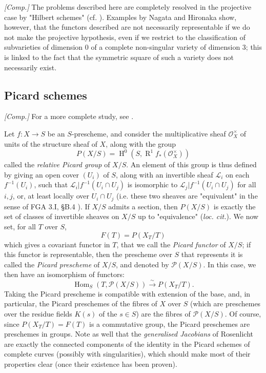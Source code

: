 \begin{remark}\label{fga3.ii-c.2-remark}
    \emph{[Comp.]}
    The problems described here are completely resolved in the projective case by "Hilbert schemes" (cf. ).
    Examples by Nagata and Hironaka show, however, that the functors described are not necessarily representable if we do not make the projective hypothesis, even if we restrict to the classification of subvarieties of dimension $0$ of a complete non-singular variety of dimension $3$;
    this is linked to the fact that the symmetric square of such a variety does not necessarily exist.
\end{remark}

\subsection{Picard schemes}\label{fga3.ii-c.3}

\emph{[Comp.]}
For a more complete study, see .

Let $f\colon X\to S$ be an $S$-prescheme, and consider the multiplicative sheaf $\mathcal{O}_X^\times$ of units of the structure sheaf of $X$, along with the group
\[
    P(X/S)
    = \operatorname{H}^0(S,\operatorname{R}^1f_*(\mathcal{O}_X^\times))
\]
called the \emph{relative Picard group} of $X/S$.
An element of this group is thus defined by giving an open cover $(U_i)$ of $S$, along with an invertible sheaf $\mathcal{L}_i$ on each $f^{-1}(U_i)$, such that $\mathcal{L}_i|f^{-1}(U_i\cap U_j)$ is isomorphic to $\mathcal{L}_j|f^{-1}(U_i\cap U_j)$ for all $i,j$, or, at least locally over $U_i\cap U_j$ (i.e. these two sheaves are "equivalent" in the sense of FGA 3.I, §B.4 ).
If $X/S$ admits a section, then $P(X/S)$ is exactly the set of classes of invertible sheaves on $X/S$ up to "equivalence" (\emph{loc. cit.}).
We now set, for all $T$ over $S$,
\[
    F(T)
    = P(X_T/T)
\]
which gives a covariant functor in $T$, that we call the \emph{Picard functor} of $X/S$;
if this functor is representable, then the prescheme over $S$ that represents it is called the \emph{Picard prescheme} of $X/S$, and denoted by $\mathcal{P}(X/S)$.
In this case, we then have an isomorphism of functors:
\[
    \operatorname{Hom}_S(T,\mathcal{P}(X/S)) \xrightarrow{\sim} P(X_T/T).
\]
Taking the Picard prescheme is compatible with extension of the base, and, in particular, the Picard preschemes of the fibres of $X$ over $S$ (which are preschemes over the residue fields $K(s)$ of the $s\in S$) are the fibres of $\mathcal{P}(X/S)$.
Of course, since $P(X_T/T)=F(T)$ is a commutative group, the Picard preschemes are preschemes in groups.
Note as well that the \emph{generalised Jacobians} of Rosenlicht are exactly the connected components of the identity in the Picard schemes of complete curves (possibly with singularities), which should make most of their properties clear (once their existence has been proven).

